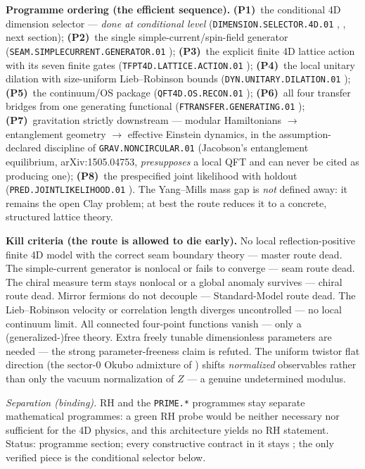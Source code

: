 \documentclass[11pt,a4paper]{article}
\begin{document}
\par\smallskip\noindent\textbf{Programme ordering (the efficient sequence).}
\textbf{(P1)}~the conditional 4D dimension selector --- \emph{done at conditional level}
(\texttt{DIMENSION.SELECTOR.4D.01} \mC, , next section);
\textbf{(P2)}~the single simple-current/spin-field generator
(\texttt{SEAM.SIMPLECURRENT.GENERATOR.01} \mO);
\textbf{(P3)}~the explicit finite 4D lattice action with its seven finite gates
(\texttt{TFPT4D.LATTICE.ACTION.01} \mO);
\textbf{(P4)}~the local unitary dilation with size-uniform Lieb--Robinson bounds
(\texttt{DYN.UNITARY.DILATION.01} \mO);
\textbf{(P5)}~the continuum/OS package (\texttt{QFT4D.OS.RECON.01} \mO);
\textbf{(P6)}~all four transfer bridges from one generating functional
(\texttt{FTRANSFER.GENERATING.01} \mO);
\textbf{(P7)}~gravitation strictly downstream --- modular Hamiltonians $\to$ entanglement
geometry $\to$ effective Einstein dynamics, in the assumption-declared discipline of
\texttt{GRAV.NONCIRCULAR.01} (Jacobson's entanglement equilibrium, arXiv:1505.04753,
\emph{presupposes} a local QFT and can never be cited as producing one);
\textbf{(P8)}~the prespecified joint likelihood with holdout
(\texttt{PRED.JOINTLIKELIHOOD.01} \mO).
The Yang--Mills mass gap is \emph{not} defined away: it remains the open Clay problem; at best
the route reduces it to a concrete, structured lattice theory.

\par\smallskip\noindent\textbf{Kill criteria (the route is allowed to die early).}
No local reflection-positive finite 4D model with the correct seam boundary theory --- master
route dead.  The simple-current generator is nonlocal or fails to converge --- seam route dead.
The chiral measure term stays nonlocal or a global anomaly survives --- chiral route dead.
Mirror fermions do not decouple --- Standard-Model route dead.  The Lieb--Robinson velocity or
correlation length diverges uncontrolled --- no local continuum limit.  All connected four-point
functions vanish --- only a (generalized-)free theory.  Extra freely tunable dimensionless
parameters are needed --- the strong parameter-freeness claim is refuted.  The uniform twistor
flat direction (the sector-0 Okubo admixture of ) shifts
\emph{normalized} observables rather than only the vacuum normalization of $Z$ --- a genuine
undetermined modulus.

\par\smallskip\noindent\emph{Separation (binding).}  RH and the \texttt{PRIME.*} programmes stay
separate mathematical programmes: a green RH probe would be neither necessary nor sufficient for
the 4D physics, and this architecture yields no RH statement.  Status: programme section; every
constructive contract in it stays \mO; the only verified piece is the conditional selector
below.
\end{document}
